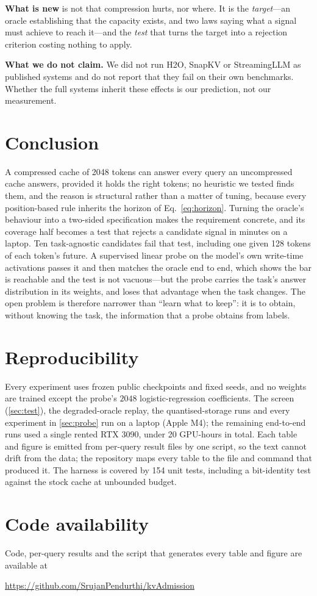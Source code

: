 \documentclass[10pt]{article}
\begin{document}
\textbf{What is new} is not that compression hurts, nor where. It is the
\emph{target}---an oracle establishing that the capacity exists, and two laws
saying what a signal must achieve to reach it---and the \emph{test} that turns
the target into a rejection criterion costing nothing to apply.

\textbf{What we do not claim.} We did not run H2O, SnapKV or StreamingLLM as
published systems and do not report that they fail on their own benchmarks.
Whether the full systems inherit these effects is our prediction, not our
measurement.

\section{Conclusion}

A compressed cache of 2048 tokens can answer every query an uncompressed cache
answers, provided it holds the right tokens; no heuristic we tested finds them,
and the reason is structural rather than a matter of tuning, because every
position-based rule inherits the horizon of Eq.~\eqref{eq:horizon}. Turning the
oracle's behaviour into a two-sided specification makes the requirement
concrete, and its coverage half becomes a test that rejects a candidate signal
in minutes on a laptop. Ten task-agnostic candidates fail that test, including
one given 128 tokens of each token's future. A supervised linear probe on the
model's own write-time activations passes it and then matches the oracle
end to end, which shows the bar is reachable and the test is not vacuous---but
the probe carries the task's answer distribution in its weights, and loses that
advantage when the task changes. The open problem is therefore narrower than
``learn what to keep'': it is to obtain, without knowing the task, the
information that a probe obtains from labels.

\section*{Reproducibility}

Every experiment uses frozen public checkpoints and fixed seeds, and no
weights are trained except the probe's $2048$ logistic-regression
coefficients. The screen (\cref{sec:test}), the degraded-oracle replay, the
quantised-storage runs and every experiment in \cref{sec:probe} run on a laptop
(Apple M4); the remaining end-to-end runs used a single rented RTX 3090, under
20 GPU-hours in total. Each table and figure is emitted from per-query result
files by one script, so the text cannot drift from the data; the repository maps
every table to the file and command that produced it. The harness is covered by
154 unit tests, including a bit-identity test against the stock cache at
unbounded budget.

\section*{Code availability}

Code, per-query results and the script that generates every table and figure
are available at
\begin{center}\url{https://github.com/SrujanPendurthi/kvAdmission}\end{center}



\end{document}
